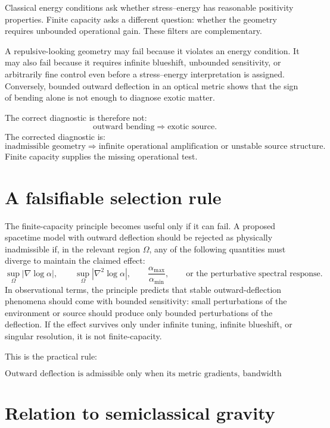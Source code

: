 \documentclass[11pt]{article}
\begin{document}
Classical energy conditions ask whether stress--energy has reasonable positivity properties.  Finite capacity asks a different question: whether the geometry requires unbounded operational gain.  These filters are complementary.

A repulsive-looking geometry may fail because it violates an energy condition.  It may also fail because it requires infinite blueshift, unbounded sensitivity, or arbitrarily fine control even before a stress--energy interpretation is assigned.  Conversely, bounded outward deflection in an optical metric shows that the sign of bending alone is not enough to diagnose exotic matter.

The correct diagnostic is therefore not:
\[
        \text{outward bending} \Rightarrow \text{exotic source}.
\]
The corrected diagnostic is:
\[
        \text{inadmissible geometry} \Rightarrow
        \text{infinite operational amplification or unstable source structure}.
\]
Finite capacity supplies the missing operational test.

\section{A falsifiable selection rule}

The finite-capacity principle becomes useful only if it can fail.  A proposed spacetime model with outward deflection should be rejected as physically inadmissible if, in the relevant region $\Omega$, any of the following quantities must diverge to maintain the claimed effect:
\[
        \sup_{\Omega}|\nabla\log\alpha|,
        \qquad
        \sup_{\Omega}|\nabla^2\log\alpha|,
        \qquad
        \frac{\alpha_{\max}}{\alpha_{\min}},
        \qquad
        \text{or the perturbative spectral response}.
\]
In observational terms, the principle predicts that stable outward-deflection phenomena should come with bounded sensitivity: small perturbations of the environment or source should produce only bounded perturbations of the deflection.  If the effect survives only under infinite tuning, infinite blueshift, or singular resolution, it is not finite-capacity.

This is the practical rule:

\[
        \boxed{
        \text{Outward deflection is admissible only when its metric gradients, bandwidth demands, and perturbative response remain bounded.}
        }
\]

\section{Relation to semiclassical gravity}
\end{document}
